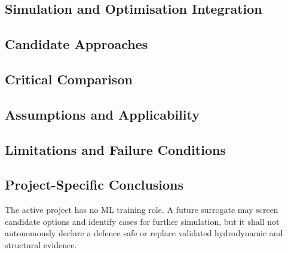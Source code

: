 
\subsection{Simulation and Optimisation Integration}
\label{sec:res-ml-rol-simulation-optimisation-integration}


\subsection{Candidate Approaches}
\label{sec:res-ml-rol-candidate-approaches}


\subsection{Critical Comparison}
\label{sec:res-ml-rol-critical-comparison}


\subsection{Assumptions and Applicability}
\label{sec:res-ml-rol-assumptions}


\subsection{Limitations and Failure Conditions}
\label{sec:res-ml-rol-limitations}


\subsection{Project-Specific Conclusions}
\label{sec:res-ml-rol-conclusions}

The active project has no ML training role. A future surrogate may
screen candidate options and identify cases for further simulation,
but it shall not autonomously declare a defence safe or replace
validated hydrodynamic and structural evidence.

